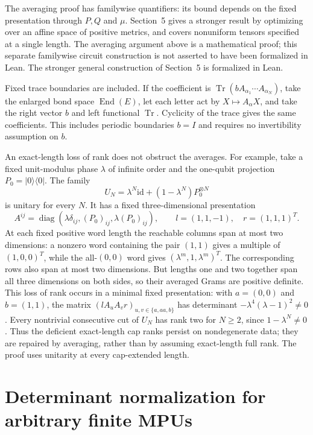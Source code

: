 \documentclass[11pt]{article}
\newcommand{\id}{\mathrm{id}}
\begin{document}
The averaging proof has familywise quantifiers: its bound depends
on the fixed presentation through $P,Q$ and $\mu$. Section~5 gives
a stronger result by optimizing over an affine space of positive
metrics, and covers nonuniform tensors specified at a single length.
The averaging argument above is a mathematical proof; this separate
familywise circuit construction is not asserted to have been formalized
in Lean. The stronger general construction of Section~5 is formalized
in Lean.

Fixed trace boundaries are included. If the coefficient is
$\operatorname{Tr}(bA_{\alpha_1}\cdots A_{\alpha_N})$, take the enlarged
bond space $\operatorname{End}(E)$, let each letter act by
$X\mapsto A_\alpha X$, and take the right vector $b$ and left
functional $\operatorname{Tr}$. Cyclicity of the trace gives the
same coefficients. This includes periodic boundaries $b=I$ and
requires no invertibility assumption on $b$.

An exact-length loss of rank does not obstruct the averages.
For example, take a fixed unit-modulus phase $\lambda$ of infinite order and the
one-qubit projection $P_0=|0\rangle\langle0|$. The family
\[
 U_N=\lambda^N\id+(1-\lambda^N)P_0^{\otimes N}
\]
is unitary for every $N$. It has a fixed three-dimensional
presentation
\[
 A^{ij}=\operatorname{diag}(\lambda\delta_{ij},
                  (P_0)_{ij},\lambda(P_0)_{ij}),\qquad
 l=(1,1,-1),\quad r=(1,1,1)^T.
\]
At each fixed positive word length the reachable columns span
at most two dimensions: a nonzero word containing the pair
$(1,1)$ gives a multiple of $(1,0,0)^T$, while the all-$(0,0)$
word gives
$(\lambda^m,1,\lambda^m)^T$. The corresponding rows also span
at most two dimensions. But lengths one and two together span
all three dimensions on both sides, so their averaged Grams are
positive definite. This loss of rank occurs in a minimal fixed
presentation: with $a=(0,0)$ and $b=(1,1)$, the matrix
$(lA_uA_vr)_{u,v\in\{a,aa,b\}}$ has determinant
$-\lambda^4(\lambda-1)^2\ne0$. Every nontrivial consecutive
cut of $U_N$ has rank two for $N\geq2$, since
$1-\lambda^N\ne0$. Thus the deficient exact-length cap ranks
persist on nondegenerate data; they are repaired by averaging, rather
than by assuming exact-length full rank. The proof uses unitarity at
every cap-extended length.

\clearpage
\section{Determinant normalization for arbitrary finite MPUs}
\label{sec:determinant-normalization}
\end{document}
